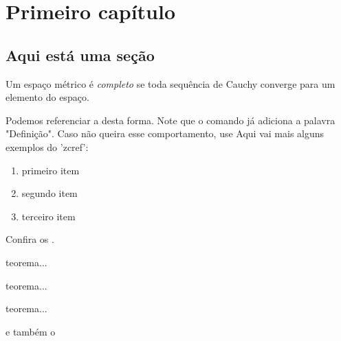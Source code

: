 \documentclass[../dissertacao]{subfiles}
\begin{document}
\chapter{Primeiro capítulo}

\section{Aqui está uma seção}

\begin{definition}\label{def:completo}
    Um espaço métrico é \emph{completo} se toda sequência de Cauchy converge para um elemento do espaço. 
\end{definition}

Podemos referenciar a  desta forma. Note que o comando já adiciona a palavra "Definição". Caso não queira esse comportamento, use 
Aqui vai mais alguns exemplos do 'zcref':

\begin{enumerate}
    \item primeiro item \label{item:1}
    \item segundo item \label{item:2}
    \item terceiro item \label{item:3}
\end{enumerate}

Confira os .

\begin{theorem}\label{thm:a}
    teorema...
\end{theorem}
\begin{theorem}\label{thm:b}
    teorema...
\end{theorem}
\begin{theorem}\label{thm:c}
    teorema...
\end{theorem}

 e também o 

\lipsum
\end{document}
